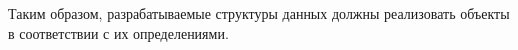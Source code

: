 Таким образом, разрабатываемые структуры данных должны реализовать объекты  в соответствии с их определениями.

